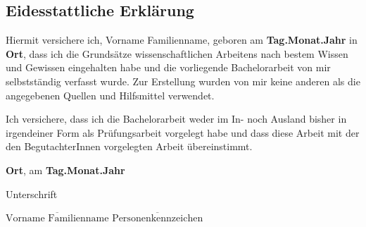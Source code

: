 \subsection*{Eidesstattliche Erklärung}

Hiermit versichere ich, Vorname Familienname, geboren am {\bf Tag.Monat.Jahr} in {\bf Ort}, dass ich die Grundsätze wissenschaftlichen Arbeitens nach bestem Wissen und Gewissen eingehalten habe und die vorliegende Bachelorarbeit von mir selbstständig verfasst wurde. Zur Erstellung wurden von mir keine anderen als die angegebenen Quellen und Hilfsmittel verwendet. 

Ich versichere, dass ich die Bachelorarbeit weder im In- noch Ausland bisher in irgendeiner Form als Prüfungsarbeit vorgelegt habe und dass diese Arbeit mit der den BegutachterInnen vorgelegten Arbeit übereinstimmt.


\vspace*{3cm}

{\bf Ort}, am {\bf Tag.Monat.Jahr}


\hfill


Unterschrift

\vspace*{1cm}

$\overline{\text{Vorname Familienname}}$ \hfill	$\overline{\text{Personenkennzeichen}}$

